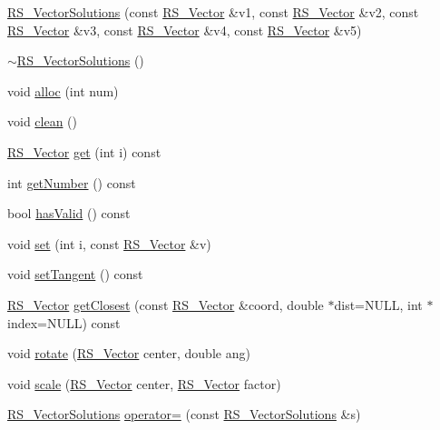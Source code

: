 \begin{DoxyCompactItemize}
\hyperlink{class_r_s___vector_solutions_af7bbc51fa55eb36180d79e261e9ef3f9}{R\-S\-\_\-\-Vector\-Solutions} (const \hyperlink{class_r_s___vector}{R\-S\-\_\-\-Vector} \&v1, const \hyperlink{class_r_s___vector}{R\-S\-\_\-\-Vector} \&v2, const \hyperlink{class_r_s___vector}{R\-S\-\_\-\-Vector} \&v3, const \hyperlink{class_r_s___vector}{R\-S\-\_\-\-Vector} \&v4, const \hyperlink{class_r_s___vector}{R\-S\-\_\-\-Vector} \&v5)
\item 
\hyperlink{class_r_s___vector_solutions_a1ea3e801ea26995f88f40d963561eef5}{$\sim$\-R\-S\-\_\-\-Vector\-Solutions} ()
\item 
void \hyperlink{class_r_s___vector_solutions_ada403e67b8b57927fdaf83a2cac46199}{alloc} (int num)
\item 
void \hyperlink{class_r_s___vector_solutions_abc5911dc619e31c1de30aaa34379402b}{clean} ()
\item 
\hyperlink{class_r_s___vector}{R\-S\-\_\-\-Vector} \hyperlink{class_r_s___vector_solutions_abbc7c2f7555426ebcada25eb84175d64}{get} (int i) const 
\item 
int \hyperlink{class_r_s___vector_solutions_ac58714e2b0e2f2f91a21c3832f9cdfb7}{get\-Number} () const 
\item 
bool \hyperlink{class_r_s___vector_solutions_a4effe2cdc76aa4add84ba412363b8727}{has\-Valid} () const 
\item 
void \hyperlink{class_r_s___vector_solutions_acb15556964c07cf20c59c4b26bad2623}{set} (int i, const \hyperlink{class_r_s___vector}{R\-S\-\_\-\-Vector} \&v)
\item 
void \hyperlink{class_r_s___vector_solutions_a2e6842c0cb665100016c9d55520f3806}{set\-Tangent} () const 
\item 
\hyperlink{class_r_s___vector}{R\-S\-\_\-\-Vector} \hyperlink{class_r_s___vector_solutions_a90f40d73f2aee013412193d84fdf6f63}{get\-Closest} (const \hyperlink{class_r_s___vector}{R\-S\-\_\-\-Vector} \&coord, double $\ast$dist=N\-U\-L\-L, int $\ast$index=N\-U\-L\-L) const 
\item 
void \hyperlink{class_r_s___vector_solutions_a805c121b14d24ee9fd936e934567dacb}{rotate} (\hyperlink{class_r_s___vector}{R\-S\-\_\-\-Vector} center, double ang)
\item 
void \hyperlink{class_r_s___vector_solutions_a978f76030765a94779a320adf5ae19b5}{scale} (\hyperlink{class_r_s___vector}{R\-S\-\_\-\-Vector} center, \hyperlink{class_r_s___vector}{R\-S\-\_\-\-Vector} factor)
\item 
\hyperlink{class_r_s___vector_solutions}{R\-S\-\_\-\-Vector\-Solutions} \hyperlink{class_r_s___vector_solutions_a5a27d7083459e4e320aad63cd8f56cf9}{operator=} (const \hyperlink{class_r_s___vector_solutions}{R\-S\-\_\-\-Vector\-Solutions} \&s)
\end{DoxyCompactItemize}
